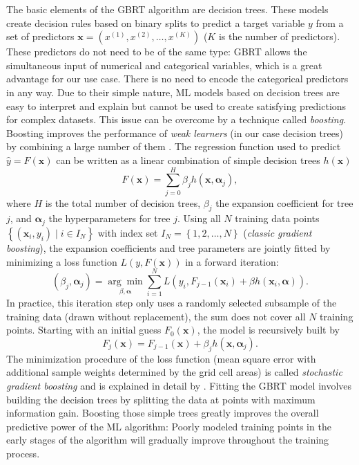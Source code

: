 The basic elements of the \ac{GBRT} algorithm are decision trees. These models
create decision rules based on binary splits to predict a target variable $y$
from a set of predictors $\bm{x} = \left( x^{(1)}, x^{(2)}, \ldots, x^{(K)}
\right)$ ($K$ is the number of predictors). These predictors do not need to be
of the same type: \ac{GBRT} allows the simultaneous input of numerical and
categorical variables, which is a great advantage for our use case. There is no
need to encode the categorical predictors in any way. Due to their simple
nature, \acf{ML} models based on decision trees are easy to interpret and
explain but cannot be used to create satisfying predictions for complex
datasets. This issue can be overcome by a technique called \emph{boosting}.
Boosting improves the performance of \emph{weak learners} (in our case decision
trees) by combining a large number of them  \autocite{Freund1996}. The
regression function used to predict $\hat{y} = F(\bm{x})$ can be written as a
linear combination of simple decision trees $h(\bm{x})$
\begin{equation}
  F(\bm{x}) = \sum_{j=0}^{H} \beta_j h(\bm{x}, \bm{\alpha}_j),
  \label{eq:app:b:f_x_sum}
\end{equation}
where $H$ is the total number of decision trees, $\beta_j$ the expansion
coefficient for tree $j$, and $\bm{\alpha}_j$ the hyperparameters for tree $j$.
Using all $N$ training data points $\left\{ \left( \bm{x}_i, y_i \right) \mid i
\in I_N \right\}$ with index set $I_N = \left\{ 1, 2, \ldots, N \right\}$
(\emph{classic gradient boosting}), the expansion coefficients and tree
parameters are jointly fitted by minimizing a loss function $L \left( y,
F(\bm{x}) \right)$ in a forward iteration:
\begin{equation}
  \left( \beta_j, \bm{\alpha}_j \right) = \underset{\beta,
    \bm{\alpha}}{\arg\min} \sum_{i=1}^{N} L \left( y_i, F_{j-1}(\bm{x}_i) +
  \beta h(\bm{x}_i, \bm{\alpha}) \right).
  \label{eq:app:b:beta_alpha}
\end{equation}
In practice, this iteration step only uses a randomly selected subsample of the
training data (drawn without replacement), \ie{} the sum does not cover all $N$
training points. Starting with an initial guess $F_0(\bm{x})$, the model is
recursively built by
\begin{equation}
  F_j(\bm{x}) = F_{j-1}(\bm{x}) + \beta_j h(\bm{x}, \bm{\alpha}_j).
  \label{eq:app:b:f_x_recursion}
\end{equation}
The minimization procedure of the loss function (mean square error with
additional sample weights determined by the grid cell areas) is called
\emph{stochastic gradient boosting} and is explained in detail by
\textcite{Friedman2001, Friedman2002}. Fitting the \ac{GBRT} model involves
building the decision trees by splitting the data at points with maximum
information gain. Boosting those simple trees greatly improves the overall
predictive power of the \ac{ML} algorithm: Poorly modeled training points in
the early stages of the algorithm will gradually improve throughout the
training process.

